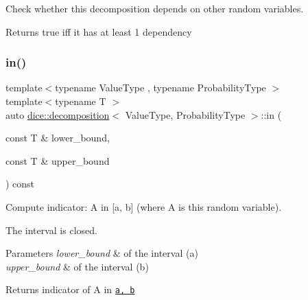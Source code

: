Check whether this decomposition depends on other random variables. 

\begin{DoxyReturn}{Returns}
true iff it has at least 1 dependency 
\end{DoxyReturn}
\mbox{\label{classdice_1_1decomposition_a39d3bb536e99cd66b2e1c8a0a7a0edc6}} 
\subsubsection{\texorpdfstring{in()}{in()}}
{\footnotesize\ttfamily template$<$typename Value\+Type , typename Probability\+Type $>$ \\
template$<$typename T $>$ \\
auto \mbox{\hyperlink{classdice_1_1decomposition}{dice\+::decomposition}}$<$ Value\+Type, Probability\+Type $>$\+::in (\begin{DoxyParamCaption}\item[{const T \&}]{lower\+\_\+bound,  }\item[{const T \&}]{upper\+\_\+bound }\end{DoxyParamCaption}) const\hspace{0.3cm}{\ttfamily [inline]}}



Compute indicator\+: A in \mbox{[}a, b\mbox{]} (where A is this random variable). 

The interval is closed.


\begin{DoxyParams}{Parameters}
{\em lower\+\_\+bound} & of the interval (a) \\
\hline
{\em upper\+\_\+bound} & of the interval (b)\\
\hline
\end{DoxyParams}
\begin{DoxyReturn}{Returns}
indicator of A in \href{i.e. a random variable with a bernoulli distribution}{\tt a, b} 
\end{DoxyReturn}
\mbox{\label{classdice_1_1decomposition_a9ba902091f71d0e6beffc20e9fdcbc80}} 
